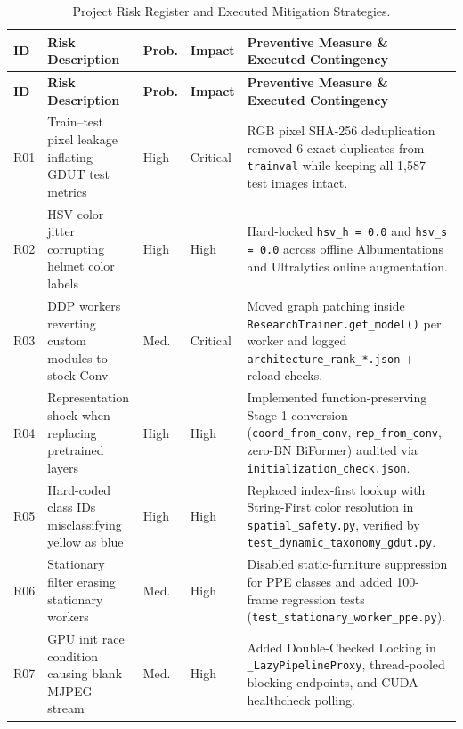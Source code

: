 \begin{longtable}{|>{\centering\arraybackslash}p{0.8cm}|>{\raggedright\arraybackslash}p{2.9cm}|>{\centering\arraybackslash}p{1.3cm}|>{\centering\arraybackslash}p{1.4cm}|>{\raggedright\arraybackslash}p{6.9cm}|}
\caption{Project Risk Register and Executed Mitigation Strategies.}
\label{tab:ch2_risk_matrix} \\
\hline
\rowcolor{slatehdr}
\textbf{ID} & \textbf{Risk Description} & \textbf{Prob.} & \textbf{Impact} & \textbf{Preventive Measure \& Executed Contingency} \\
\hline
\endfirsthead
\hline
\rowcolor{slatehdr}
\textbf{ID} & \textbf{Risk Description} & \textbf{Prob.} & \textbf{Impact} & \textbf{Preventive Measure \& Executed Contingency} \\
\hline
\endhead
\hline
\endfoot
R01 & Train--test pixel leakage inflating GDUT test metrics & High & Critical & RGB pixel SHA-256 deduplication removed 6 exact duplicates from \texttt{trainval} while keeping all 1,587 test images intact. \\ \hline
R02 & HSV color jitter corrupting helmet color labels & High & High & Hard-locked \texttt{hsv\_h = 0.0} and \texttt{hsv\_s = 0.0} across offline Albumentations and Ultralytics online augmentation. \\ \hline
R03 & DDP workers reverting custom modules to stock Conv & Med. & Critical & Moved graph patching inside \nolinkurl{ResearchTrainer.get_model()} per worker and logged \nolinkurl{architecture_rank_*.json} + reload checks. \\ \hline
R04 & Representation shock when replacing pretrained layers & High & High & Implemented function-preserving Stage 1 conversion (\texttt{coord\_from\_conv}, \texttt{rep\_from\_conv}, zero-BN BiFormer) audited via \nolinkurl{initialization_check.json}. \\ \hline
R05 & Hard-coded class IDs misclassifying yellow as blue & High & High & Replaced index-first lookup with String-First color resolution in \nolinkurl{spatial_safety.py}, verified by \nolinkurl{test_dynamic_taxonomy_gdut.py}. \\ \hline
R06 & Stationary filter erasing stationary workers & Med. & High & Disabled static-furniture suppression for PPE classes and added 100-frame regression tests (\nolinkurl{test_stationary_worker_ppe.py}). \\ \hline
R07 & GPU init race condition causing blank MJPEG stream & Med. & High & Added Double-Checked Locking in \nolinkurl{_LazyPipelineProxy}, thread-pooled blocking endpoints, and CUDA healthcheck polling. \\ \hline

\end{longtable}
